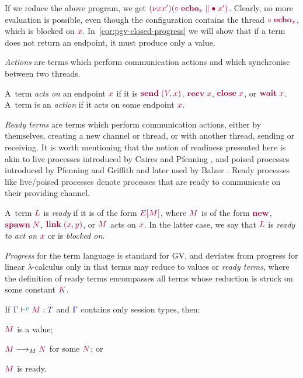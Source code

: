 If we reduce the above program, we get $\tm{\res{x}{x'}{(\ppar{\child\;\echo_{x}}{\main\;x'})}}$. Clearly, no more evaluation is possible, even though the configuration contains the thread $\tm{\child\;\echo_{x}}$, which is blocked on $\tm{x}$. In~\cref{cor:pgv-closed-progress} we will show that if a term does not return an endpoint, it must produce {only} a value.

\emph{Actions} are terms which perform communication actions and which synchronise between two threads.
\begin{defi}\label{def:pgv-actions}
  A~term \emph{acts on} an endpoint $\tm{x}$ if it is $\tm{\send\;\pair{V}{x}}$, $\tm{\recv\;{x}}$, $\tm{\close\;{x}}$, or $\tm{\wait\;{x}}$. A~term is an \emph{action} if it acts on some endpoint $\tm{x}$.
\end{defi}

\emph{Ready terms} are terms which perform communication actions, either by themselves, \eg creating a new channel or thread, or with another thread, \eg sending or receiving.
It is worth mentioning that the notion of readiness presented here is akin to {live} processes introduced by Caires and Pfenning \cite{cairespfenning10,DardhaP22}, and {poised} processes introduced by Pfenning and Griffith \cite{PfenningG15} and later used by Balzer \etal \cite{balzerpfenning17,balzertoninho19}. Ready processes like live/poised processes denote processes that are ready to communicate on their providing channel.
\begin{defi}\label{def:pgv-ready-actions}
  A~term $\tm{L}$ is \emph{ready} if it is of the form $\tm{\plug{E}{M}}$, where $\tm{M}$ is of the form $\tm{\new}$, $\tm{\spawn\;N}$, $\tm{\link\;\pair{x}{y}}$, or $\tm{M}$ acts on $\tm{x}$. In the latter case, we say that $\tm{L}$ is \emph{ready to act on} $\tm{x}$ or is \emph{blocked on}.
\end{defi}

\emph{Progress} for the term language is standard for GV, and deviates from progress for linear $\lambda$-calculus only in that terms may reduce to values or \emph{ready terms}, where the definition of ready terms encompasses all terms whose reduction is struck on some constant $\tm{K}$.

\begin{lem}\label{lem:pgv-open-progress-terms}
  If $\tseq[\cs{p}]{\ty{\Gamma}}{M}{T}$ and $\ty{\Gamma}$ contains only session types, then:
  \begin{enumerate*}[label= (\roman*) ]
    \item $\tm{M}$ is a value;
    \item $\tm{M}\tred\tm{N}$ for some $\tm{N}$; or
    \item $\tm{M}$ is ready.
  \end{enumerate*}
\end{lem}

